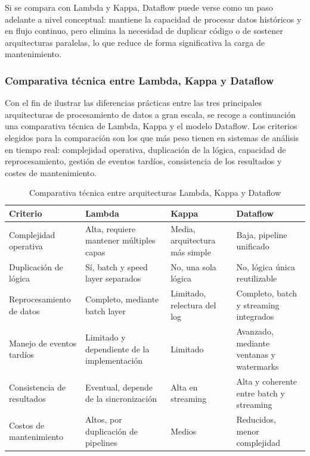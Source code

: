 \documentclass[12pt,a4paper]{article}
\begin{document}
Si se compara con Lambda y Kappa, Dataflow puede verse como un paso adelante a nivel conceptual: mantiene la capacidad de procesar datos históricos y en flujo continuo, pero elimina la necesidad de duplicar código o de sostener arquitecturas paralelas, lo que reduce de forma significativa la carga de mantenimiento.

\subsubsection{Comparativa técnica entre Lambda, Kappa y Dataflow}
Con el fin de ilustrar las diferencias prácticas entre las tres principales arquitecturas de procesamiento de datos a gran escala, se recoge a continuación una comparativa técnica de Lambda, Kappa y el modelo Dataflow.
Los criterios elegidos para la comparación son los que más peso tienen en sistemas de análisis en tiempo real: complejidad operativa, duplicación de la lógica, capacidad de reprocesamiento, gestión de eventos tardíos, consistencia de los resultados y costes de mantenimiento.

\begin{table}[H]
    \centering
    \caption{Comparativa técnica entre arquitecturas Lambda, Kappa y Dataflow}
    \begin{tabular}{@{}p{}p{}p{}p{}@{}}
        \toprule
        \textbf{Criterio}          & \textbf{Lambda}                             & \textbf{Kappa}                 & \textbf{Dataflow}                        \\
        \midrule
        Complejidad operativa      & Alta, requiere mantener múltiples capas     & Media, arquitectura más simple & Baja, pipeline unificado                 \\
        Duplicación de lógica      & Sí, batch y speed layer separados           & No, una sola lógica            & No, lógica única reutilizable            \\
        Reprocesamiento de datos   & Completo, mediante batch layer              & Limitado, relectura del log    & Completo, batch y streaming integrados   \\
        Manejo de eventos tardíos  & Limitado y dependiente de la implementación & Limitado                       & Avanzado, mediante ventanas y watermarks \\
        Consistencia de resultados & Eventual, depende de la sincronización      & Alta en streaming              & Alta y coherente entre batch y streaming \\
        Costos de mantenimiento    & Altos, por duplicación de pipelines         & Medios                         & Reducidos, menor complejidad             \\
        \bottomrule
    \end{tabular}
\end{table}
\end{document}
